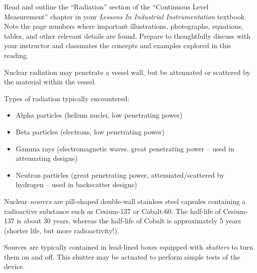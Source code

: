 

Read and outline the ``Radiation'' section of the ``Continuous Level Measurement'' chapter in your {\it Lessons In Industrial Instrumentation} textbook.  Note the page numbers where important illustrations, photographs, equations, tables, and other relevant details are found.  Prepare to thoughtfully discuss with your instructor and classmates the concepts and examples explored in this reading.














Nuclear radiation may penetrate a vessel wall, but be attenuated or scattered by the material within the vessel.

\vskip 10pt

Types of radiation typically encountered:

\begin{itemize}
\item{} Alpha particles (helium nuclei, low penetrating power)
\item{} Beta particles (electrons, low penetrating power)
\item{} Gamma rays (electromagnetic waves, great penetrating power -- used in attenuating designs)
\item{} Neutron particles (great penetrating power, attenuated/scattered by hydrogen -- used in backscatter designs)
\end{itemize}

Nuclear {\it sources} are pill-shaped double-wall stainless steel capsules containing a radioactive substance such as Cesium-137 or Cobalt-60.  The half-life of Cesium-137 is about 30 years, whereas the half-life of Cobalt is approximately 5 years (shorter life, but more radioactivity!).

\vskip 10pt

Sources are typically contained in lead-lined boxes equipped with {\it shutters} to turn them on and off.  This shutter may be actuated to perform simple tests of the device.


